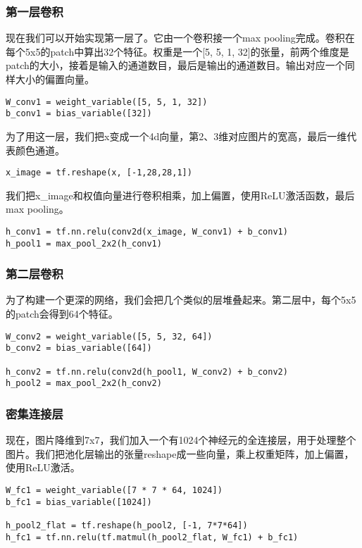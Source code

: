 \subsubsection{第一层卷积}

现在我们可以开始实现第一层了。它由一个卷积接一个max pooling完成。卷积在每个5x5的patch中算出32个特征。权重是一个[5, 5, 1, 32]的张量，前两个维度是patch的大小，接着是输入的通道数目，最后是输出的通道数目。输出对应一个同样大小的偏置向量。

\begin{lstlisting}
W_conv1 = weight_variable([5, 5, 1, 32])
b_conv1 = bias_variable([32])
\end{lstlisting}

为了用这一层，我们把x变成一个4d向量，第2、3维对应图片的宽高，最后一维代表颜色通道。

\begin{lstlisting}
x_image = tf.reshape(x, [-1,28,28,1])
\end{lstlisting}

我们把x\_image和权值向量进行卷积相乘，加上偏置，使用ReLU激活函数，最后max pooling。

\begin{lstlisting}
h_conv1 = tf.nn.relu(conv2d(x_image, W_conv1) + b_conv1)
h_pool1 = max_pool_2x2(h_conv1)
\end{lstlisting}

\subsubsection{第二层卷积}

为了构建一个更深的网络，我们会把几个类似的层堆叠起来。第二层中，每个5x5的patch会得到64个特征。

\begin{lstlisting}
W_conv2 = weight_variable([5, 5, 32, 64])
b_conv2 = bias_variable([64])

h_conv2 = tf.nn.relu(conv2d(h_pool1, W_conv2) + b_conv2)
h_pool2 = max_pool_2x2(h_conv2)
\end{lstlisting}

\subsubsection{密集连接层}

现在，图片降维到7x7，我们加入一个有1024个神经元的全连接层，用于处理整个图片。我们把池化层输出的张量reshape成一些向量，乘上权重矩阵，加上偏置，使用ReLU激活。

\begin{lstlisting}
W_fc1 = weight_variable([7 * 7 * 64, 1024])
b_fc1 = bias_variable([1024])

h_pool2_flat = tf.reshape(h_pool2, [-1, 7*7*64])
h_fc1 = tf.nn.relu(tf.matmul(h_pool2_flat, W_fc1) + b_fc1)
\end{lstlisting}

